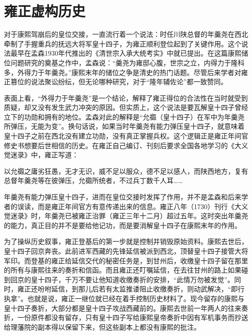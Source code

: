 \section{雍正虚构历史}


对于康熙驾崩后的皇位交接，一直流行着一个说法：时任川陕总督的年羹尧在西北牵制了手握重兵的抚远大将军皇十四子，为雍正顺利登位起到了关键作用。这个说法最早在孟森1930年代推出的《清世宗入承大统考实》中就已提出。在这篇康熙储位问题研究的奠基之作中，孟森说：“羹尧为雍邸心腹，世宗之立，内得力于隆科多，外得力于年羹尧。”康熙末年的储位之争是清史的热门话题。尽管后来学者对雍正篡位的说法聚讼纷纭，但无论哪种研究，对于“隆年辅佐论”都一致赞同。



表面上看，“外得力于年羹尧”是一个结论，解释了雍正得位的合法性在当时就受到质疑，却又没有发生武力冲突的原因。但实质上，这个说法是要瓦解皇十四子曾经立下的功勋和拥有的地位。孟森对此的解释是“允禵（皇十四子）在军中为年羹尧所弹压，无能为变”。换句话说，如果当时年羹尧有能力弹压皇十四子，就意味着皇十四子之前在西北没有建立功勋，没有真正掌握兵权。这个逻辑正是雍正年间官修史书想要后世相信的历史。在雍正自己编订、刊刻后要求全国各地学习的《大义觉迷录》中，雍正写道：



\begin{bookquote}以允禵之庸劣狂愚，无才无识，威不足以服众，德不足以感人，而陕西地方，复有总督年羹尧等在彼弹压，允禵所统者，不过兵丁数千人耳……\end{bookquote}


年羹尧有能力弹压皇十四子，进而在皇位交接时发挥了作用，并不是孟森和后来学者的误读，而是雍正年间官方有意传递出来的信息。雍正八年（1730）刊行《大义觉迷录》时，年羹尧已被雍正治罪（雍正三年十二月）超过五年。这时突出年羹尧的能力，真正目的并不是要给他记功，而是要消解皇十四子在康熙末年的作用。



为了操纵历史叙事，雍正登基后的第一步就是控制并销毁原始资料。康熙去世后，皇十四子回京奔丧。此前进军西藏的先锋延信被派到西北，顶替皇十四子接管大将军印。而登基的雍正给延信交代的秘密任务是，到甘州后，收缴皇十四子留在那里的所有与康熙往来的奏折和信函。而且雍正还叮嘱延信，在去往甘州的路上如果碰到回京的皇十四子，千万不要让他知道收缴奏折的安排，“此情万勿被发觉”。同时，雍正还吩咐延信，到那儿后若有太监推诿阻止收缴奏折，则动武解决，“即行执拿”。也就是说，雍正一继位就已经在着手控制历史材料了。现今留存的康熙与皇十四子奏折，大部分都是皇十四子攻战西藏前的。康熙去世前一年两人的往来奏折，一份原件都没有留存，只有皇十四子写给康熙皇帝奏折中因有军机事务而抄送给理藩院的副本得以保留下来，但这些副本上都没有康熙的批注。


